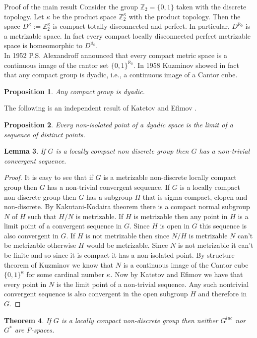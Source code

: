 \documentclass[12pt,a4paper]{amsart}
\theoremstyle{plain}
\newtheorem{theorem}{Theorem}[section]
\newtheorem{lemma}[theorem]{Lemma}
\newtheorem{prop}[theorem]{Proposition}
\theoremstyle{definition}
\begin{document}
\begin{section}{Proof of the main result}
Consider the group $\mathbb{Z}_2=\{0,1\}$ taken with the discrete topology. Let $\kappa$ be the product space $\mathbb{Z}_2^{\kappa}$ with the product topology. Then the space $D^{\kappa}:=\mathbb{Z}_2^{\kappa}$ is compact totally disconnected and perfect. In particular, $D^{\aleph_0}$ is a metrizable space. In fact every compact locally disconnected perfect metrizable space is homeomorphic to $D^{\aleph_0}$.\\
In 1952 P.S. Alexandroff announced that every compact metric space is a continuous image of the cantor set $\{0,1\}^{\aleph_0}$.
In 1958 Kuzminov \cite{MR0104753} showed in fact that any compact group is dyadic, i.e., a continuous image of a Cantor cube. 
\begin{prop}
Any compact group is dyadic.
\end{prop}
The following is an independent result of Katetov and Efimov \cite{MR0152987}. 
\begin{prop}
Every non-isolated point of a dyadic space is the limit of a sequence of distinct points.
\end{prop}
\begin{lemma}
If $G$ is a locally compact non discrete group then $G$ has a non-trivial convergent sequence.
\end{lemma}
\begin{proof}
It is easy to see that if $G$ is a metrizable non-discrete locally compact group then $G$ has a non-trivial convergent sequence. If $G$ is a locally compact non-discrete group then $G$ has a subgroup $H$ that is sigma-compact, clopen and non-discrete. By Kakutani-Kodaira theorem there is a compact normal subgroup $N$ of $H$ such that $H/N$ is metrizable. If $H$ is metrizable then any point in $H$ is a limit point of a convergent sequence in $G$. Since $H$ is open in $G$ this sequence is also convergent in $G$. If $H$ is not metrizable then since $N/H$ is metrizable $N$ can't be metrizable otherwise $H$ would be metrizable. Since $N$ is not metrizable it can't be finite and so since it is compact it has a non-isolated point. By structure theorem of Kuzminov we know that $N$ is a continuous image of the Cantor cube $\{0,1\}^{\kappa}$ for some cardinal number $\kappa$. Now by Katetov and Efimov we have that every point in $N$ is the limit point of a non-trivial sequence. Any such nontrivial convergent sequence is also convergent in the open subgroup $H$ and therefore in $G$.
\end{proof} 

\begin{theorem}
If $G$ is a locally compact non-discrete group then neither $G^{luc}$ nor $G^*$ are F-spaces.
\end{theorem} 


\end{section}
\end{document}
